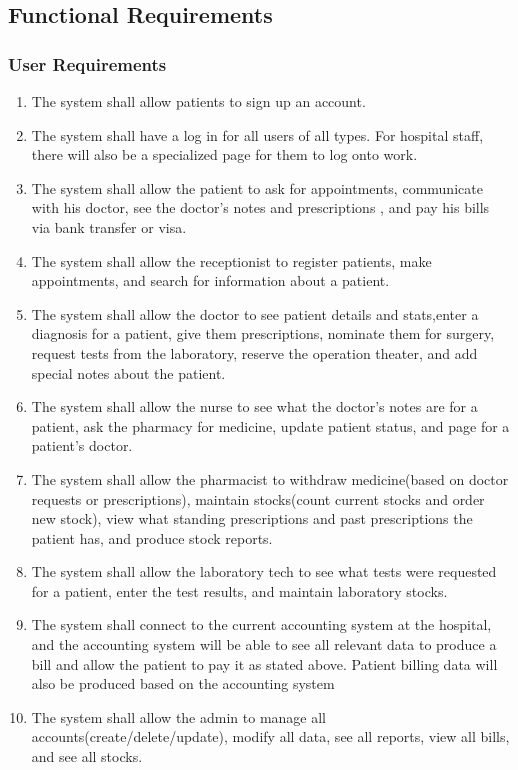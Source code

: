 \documentclass[14pt]{article}
\begin{document}
\subsection{Functional Requirements}
\subsubsection{User Requirements}
\begin{enumerate}

\item The system shall allow patients to sign up an account.

\item The system shall have a log in for all users of all types. For hospital staff, there will also be a specialized page for 
them to log onto work.

	
\item The system shall allow the patient to ask for appointments, communicate with his doctor, see the doctor's notes and
prescriptions , and pay his bills via bank transfer or visa.

\item The system shall allow the receptionist  to register patients, make appointments, and search for information about a patient.

\item The system shall allow the doctor to see patient details and stats,enter a diagnosis for a patient, give them prescriptions, nominate
them for surgery, request tests from the laboratory, reserve the operation theater, and add special notes about the patient.

\item The system shall allow the nurse to see what the doctor's notes are for a patient,
ask the pharmacy for medicine, update patient status, and page for a patient's doctor.

\item The system shall allow the pharmacist to withdraw medicine(based on doctor requests or prescriptions), maintain stocks(count current
stocks and order new stock), view what standing prescriptions and past prescriptions the patient has, and produce stock reports.

\item The system shall allow the laboratory tech to see what tests were requested for a patient, enter the test results,
and maintain laboratory stocks.

\item The system shall connect to the current accounting system at the hospital, and the accounting system will be able to see
all relevant data to produce a bill and allow the patient to pay it as stated above. Patient billing data will also be produced based
on the accounting system

\item The system shall allow the admin to manage all accounts(create/delete/update), modify all data, see all reports,
view all bills, and see all stocks.
\end{enumerate}
\newpage
\end{document}
